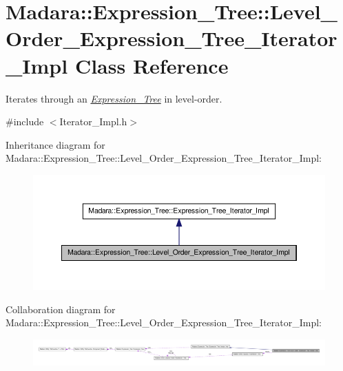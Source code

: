 \hypertarget{classMadara_1_1Expression__Tree_1_1Level__Order__Expression__Tree__Iterator__Impl}{
\section{Madara::Expression\_\-Tree::Level\_\-Order\_\-Expression\_\-Tree\_\-Iterator\_\-Impl Class Reference}
\label{dc/de7/classMadara_1_1Expression__Tree_1_1Level__Order__Expression__Tree__Iterator__Impl}
}


Iterates through an {\itshape \hyperlink{classMadara_1_1Expression__Tree_1_1Expression__Tree}{Expression\_\-Tree}\/} in level-\/order.  




{\ttfamily \#include $<$Iterator\_\-Impl.h$>$}



Inheritance diagram for Madara::Expression\_\-Tree::Level\_\-Order\_\-Expression\_\-Tree\_\-Iterator\_\-Impl:
\nopagebreak
\begin{figure}[H]
\begin{center}
\leavevmode
\includegraphics[width=400pt]{de/df5/classMadara_1_1Expression__Tree_1_1Level__Order__Expression__Tree__Iterator__Impl__inherit__graph}
\end{center}
\end{figure}


Collaboration diagram for Madara::Expression\_\-Tree::Level\_\-Order\_\-Expression\_\-Tree\_\-Iterator\_\-Impl:
\nopagebreak
\begin{figure}[H]
\begin{center}
\leavevmode
\includegraphics[width=400pt]{d2/d1b/classMadara_1_1Expression__Tree_1_1Level__Order__Expression__Tree__Iterator__Impl__coll__graph}
\end{center}
\end{figure}

